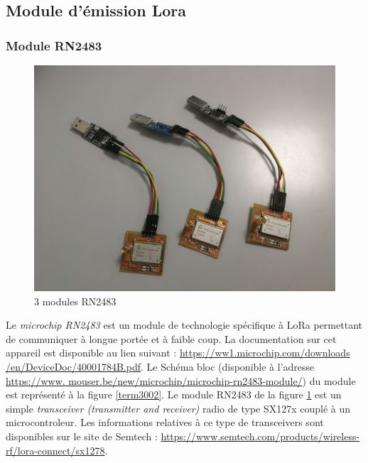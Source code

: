 \subsection{Module d'émission Lora}

\subsubsection{Module RN2483}

\begin{figure}[h]
\centering

\includegraphics[scale=0.08]{images/rn2483.png}
\caption{3 modules RN2483}\label{term34}
\end{figure}


Le \textit{microchip RN2483} est un module de technologie spécifique à LoRa permettant de communiquer à longue portée et à faible coup. La documentation sur cet appareil est disponible au lien suivant : \href{https://ww1.microchip.com/downloads/en/DeviceDoc/40001784B.pdf}{https://ww1.microchip.com/downloads
/en/DeviceDoc/40001784B.pdf}. Le Schéma bloc (disponible à l'adresse \href{https://www.mouser.be/new/microchip/microchip-rn2483-module/}{https://www.
mouser.be/new/microchip/microchip-rn2483-module/}) du module est représenté à la figure \ref{term3002}. Le module RN2483 de la figure \ref{term34} est un simple \textit{transceiver (transmitter and receiver)} radio de type SX127x couplé à un microcontroleur. Les informations relatives à ce type de transceivers sont disponibles sur le site de Semtech : \href{https://www.semtech.com/products/wireless-rf/lora-connect/sx1278}{https://www.semtech.com/products/wireless-rf/lora-connect/sx1278}.



